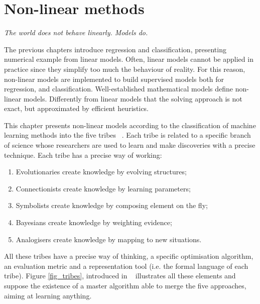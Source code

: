 \chapter{Non-linear methods}{} \label{cahpNonLinear}

\epigraph{\textit{The world does not behave linearly. Models do.}}{}


The previous chapters introduce regression and classification, presenting numerical example from linear models. Often, linear models cannot be applied in practice since they simplify too much the behaviour of reality. For this reason, non-linear models are implemented to build supervised models both for regression, and classification. Well-established mathematical models define non-linear models. Differently from linear models that the solving approach is not exact, but approximated by efficient heuristics.\par

This chapter presents non-linear models according to the classification of machine learning methods into the five tribes ~\cite{Domingos2015}. Each tribe is related to a specific branch of science whose researchers are used to learn and make discoveries with a precise technique. Each tribe has a precise way of working:

\begin{enumerate}
    \item Evolutionaries create knowledge by evolving structures;
    \item Connectionists create knowledge by learning parameters;
    \item Symbolists create knowledge by composing element on the fly;
    \item Bayesians create knowledge by weighting evidence;
    \item Analogisers create knowledge by mapping to new situations.
\end{enumerate}

All these tribes have a precise way of thinking, a specific optimisation algorithm, an evaluation metric and a representation tool (i.e. the formal language of each tribe). Figure \ref{fig_tribes}, introduced in ~\cite{Domingos2015} illustrates all these elements and suppose the existence of a master algorithm able to merge the five approaches, aiming at learning anything.

